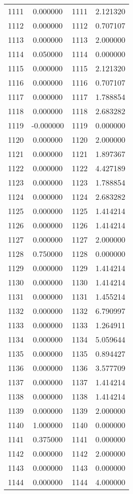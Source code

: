 \documentclass[12pt]{article}
\begin{document}
\begin{longtable}{@{}cccc@{}}
1111 & 0.000000 & 1111 & 2.121320 \\
1112 & 0.000000 & 1112 & 0.707107 \\
1113 & 0.000000 & 1113 & 2.000000 \\
1114 & 0.050000 & 1114 & 0.000000 \\
1115 & 0.000000 & 1115 & 2.121320 \\
1116 & 0.000000 & 1116 & 0.707107 \\
1117 & 0.000000 & 1117 & 1.788854 \\
1118 & 0.000000 & 1118 & 2.683282 \\
1119 & -0.000000 & 1119 & 0.000000 \\
1120 & 0.000000 & 1120 & 2.000000 \\
1121 & 0.000000 & 1121 & 1.897367 \\
1122 & 0.000000 & 1122 & 4.427189 \\
1123 & 0.000000 & 1123 & 1.788854 \\
1124 & 0.000000 & 1124 & 2.683282 \\
1125 & 0.000000 & 1125 & 1.414214 \\
1126 & 0.000000 & 1126 & 1.414214 \\
1127 & 0.000000 & 1127 & 2.000000 \\
1128 & 0.750000 & 1128 & 0.000000 \\
1129 & 0.000000 & 1129 & 1.414214 \\
1130 & 0.000000 & 1130 & 1.414214 \\
1131 & 0.000000 & 1131 & 1.455214 \\
1132 & 0.000000 & 1132 & 6.790997 \\
1133 & 0.000000 & 1133 & 1.264911 \\
1134 & 0.000000 & 1134 & 5.059644 \\
1135 & 0.000000 & 1135 & 0.894427 \\
1136 & 0.000000 & 1136 & 3.577709 \\
1137 & 0.000000 & 1137 & 1.414214 \\
1138 & 0.000000 & 1138 & 1.414214 \\
1139 & 0.000000 & 1139 & 2.000000 \\
1140 & 1.000000 & 1140 & 0.000000 \\
1141 & 0.375000 & 1141 & 0.000000 \\
1142 & 0.000000 & 1142 & 2.000000 \\
1143 & 0.000000 & 1143 & 0.000000 \\
1144 & 0.000000 & 1144 & 4.000000 \\

\end{longtable}
\end{document}
